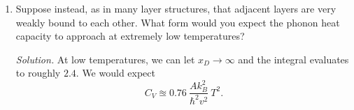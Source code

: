 \documentclass{homework}
\newcommand{\solution}{	\vspace{1em} \textit{Solution.} \quad }
\begin{document}
\begin{enumerate}
\begin{enumerate}
				\solution In the Debye model derivation on p. 111--114, if we restrict the atoms to a plane, we'll first change the allowed $\bvec{K}$ values per volume to $$\left(\frac{L}{2 \pi}\right)^3 = \frac{A}{4 \pi^2}.$$
				Then, we can change $N$ to \begin{align*}
					N & = \left(A / 4 \pi ^2\right) \left(2 \pi K^2 / 2\right) \\
						& = \frac{A}{4 \pi^2} \pi K^2.
					\intertext{Changing variables to $\omega$ using $\omega = vK \implies K^2 = \omega^2 / v^2$, then finding the density of states,}
					N(\omega) & = \frac{A \omega^2}{4 \pi v^2}. \\
					\implies D(\omega) & = \dv{N}{\omega} = \frac{A \omega}{2 \pi v^2}.
				\end{align*}
				The thermal energy is given by (5.9) using (5.7) \begin{align*}
					U & = \int \dd{\omega}  D(\omega) \expval{n(\omega)} \hbar \omega \\
						& = \frac{A}{2 \pi v^2} \int_0^{\omega_D} \dd{\omega} \omega \frac{1}{\exp(\hbar \omega / \tau) - 1} \hbar \omega \\
						& = \frac{A}{2 \pi v^2} \frac{\tau^2}{\hbar} \int_0^{\omega_D} \dd{\omega} \left(\frac{\hbar \omega}{\tau} \right)^2\frac{1}{\exp(\hbar \omega / \tau) - 1}.
					\intertext{Changing the integral variables to $x = \hbar \omega / \tau$, then $\dd{x} = \hbar \dd{\omega} / \tau$,}
					U & = \frac{A}{2 \pi v^2} \frac{\tau^3}{\hbar^2}  \underbrace{ \int_0^{x_D} \frac{x^2}{\exp(x) - 1} \dd{x}}_\text{some funky constant} \\
						& \propto \tau^3  \propto T^3. && (\tau = k_B T)
					\intertext{Thus the specific heat capacity is proportional to $T^2$,}
					C_V & = \dv{U}{T} \propto \dv{T} T^3 \\
						& \propto T^2. \qed
				\end{align*}
				\item Suppose instead, as in many layer structures, that adjacent layers are very weakly bound to each other. What form would you expect the phonon heat capacity to approach at extremely low temperatures?
				
				\solution At low temperatures, we can let $x_D \to \infty$ and the integral evaluates to roughly $2.4$. We would expect $$C_V \approxeq 0.76 \: \frac{A k_B^2 }{\hbar^2 v^2} \: T^2.$$
			\end{enumerate}
	\end{enumerate}
\end{document}
